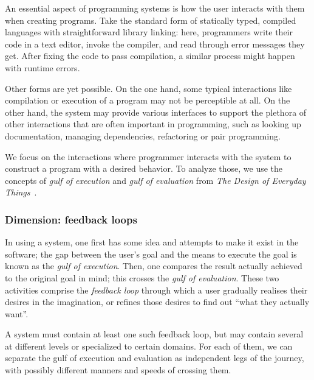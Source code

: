 \documentclass[english,submission]{programming}
\begin{document}
An essential aspect of programming systems is how the user interacts
with them when creating programs. Take the standard form of statically
typed, compiled languages with straightforward library linking: here,
programmers write their code in a text editor, invoke the compiler, and
read through error messages they get. After fixing the code to pass
compilation, a similar process might happen with runtime errors.

Other forms are yet possible. On the one hand, some typical interactions
like compilation or execution of a program may not be perceptible at
all. On the other hand, the system may provide various interfaces to
support the plethora of other interactions that are often important in
programming, such as looking up documentation, managing dependencies,
refactoring or pair programming.

We focus on the interactions where programmer interacts with the system
to construct a program with a desired behavior. To analyze those, we use
the concepts of \emph{gulf of execution} and \emph{gulf of evaluation}
from \emph{The Design of Everyday Things}~\cite{Norman}.

\hypertarget{dimension-feedback-loops}{%
\subsubsection{Dimension: feedback
loops}\label{dimension-feedback-loops}}

In using a system, one first has some idea and attempts to make it exist
in the software; the gap between the user's goal and the means to
execute the goal is known as the \emph{gulf of execution}. Then, one
compares the result actually achieved to the original goal in mind; this
crosses the \emph{gulf of evaluation}. These two activities comprise the
\emph{feedback loop} through which a user gradually realises their
desires in the imagination, or refines those desires to find out ``what
they actually want''.

A system must contain at least one such feedback loop, but may contain
several at different levels or specialized to certain domains. For each
of them, we can separate the gulf of execution and evaluation as
independent legs of the journey, with possibly different manners and
speeds of crossing them.
\end{document}
